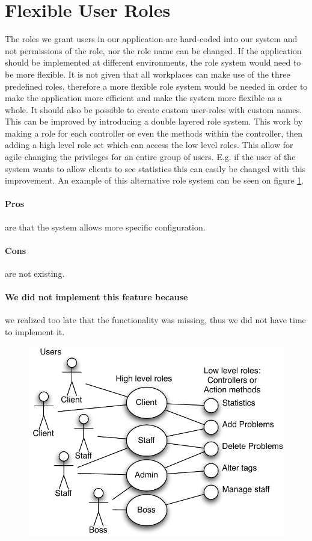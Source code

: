 \section{Flexible User Roles}
\label{sec:agile_roles}
The roles we grant users in our application are hard-coded into our system and not permissions of the role, nor the role name can be changed.
If the application should be implemented at different environments, the role system would need to be more flexible. 
It is not given that all workplaces can make use of the three predefined roles, therefore a more flexible role system would be needed in order to make the application more efficient and make the system more flexible as a whole.
It should also be possible to create custom user-roles with custom names.
This can be improved by introducing a double layered role system.  
This work by making a role for each controller or even the methods within the controller, then adding a high level role set which can access the low level roles. 
This allow for agile changing the privileges for an entire group of users. 
E.g. if the user of the system wants to allow clients to see statistics this can easily be changed with this improvement. An example of this alternative role system can be seen on figure \ref{fig:improved_role_system}.

\paragraph{Pros} are that the system allows more specific configuration. 
\paragraph{Cons} are not existing.
\paragraph{We did not implement this feature because} we realized too late that the functionality was missing, thus we did not have time to implement it.

\begin{figure}
\begin{center}
\includegraphics[scale=1]{input/epilogue/improvements/improved_role_system.pdf}
\label{fig:improved_role_system}
\end{center}
\end{figure}
